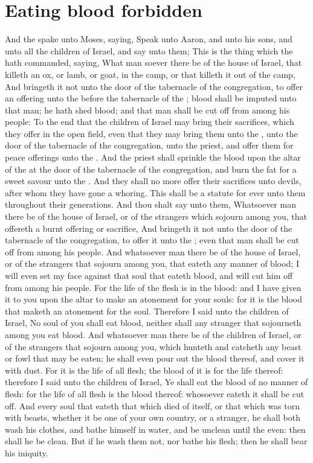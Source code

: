 \section*{Eating blood forbidden}
\begin{biblechapter} %
\verse And the \LORD spake unto Moses, saying,
\verse Speak unto Aaron, and unto his sons, and unto all the children of Israel, and say unto them; This is the thing which the \LORD hath commanded, saying,
\verse What man soever there be of the house of Israel, that killeth an ox, or lamb, or goat, in the camp, or that killeth it out of the camp,
\verse And bringeth it not unto the door of the tabernacle of the congregation, to offer an offering unto the \LORD before the tabernacle of the \LORD; blood shall be imputed unto that man; he hath shed blood; and that man shall be cut off from among his people:
\verse To the end that the children of Israel may bring their sacrifices, which they offer in the open field, even that they may bring them unto the \LORD, unto the door of the tabernacle of the congregation, unto the priest, and offer them for peace offerings unto the \LORD.
\verse And the priest shall sprinkle the blood upon the altar of the \LORD at the door of the tabernacle of the congregation, and burn the fat for a sweet savour unto the \LORD.
\verse And they shall no more offer their sacrifices unto devils, after whom they have gone a whoring. This shall be a statute for ever unto them throughout their generations.
\verse And thou shalt say unto them, Whatsoever man there be of the house of Israel, or of the strangers which sojourn among you, that offereth a burnt offering or sacrifice,
\verse And bringeth it not unto the door of the tabernacle of the congregation, to offer it unto the \LORD; even that man shall be cut off from among his people.
\verse And whatsoever man there be of the house of Israel, or of the strangers that sojourn among you, that eateth any manner of blood; I will even set my face against that soul that eateth blood, and will cut him off from among his people.
\verse For the life of the flesh is in the blood: and I have given it to you upon the altar to make an atonement for your souls: for it is the blood that maketh an atonement for the soul.
\verse Therefore I said unto the children of Israel, No soul of you shall eat blood, neither shall any stranger that sojourneth among you eat blood.
\verse And whatsoever man there be of the children of Israel, or of the strangers that sojourn among you, which hunteth and catcheth any beast or fowl that may be eaten; he shall even pour out the blood thereof, and cover it with dust.
\verse For it is the life of all flesh; the blood of it is for the life thereof: therefore I said unto the children of Israel, Ye shall eat the blood of no manner of flesh: for the life of all flesh is the blood thereof: whosoever eateth it shall be cut off.
\verse And every soul that eateth that which died of itself, or that which was torn with beasts, whether it be one of your own country, or a stranger, he shall both wash his clothes, and bathe himself in water, and be unclean until the even: then shall he be clean.
\verse But if he wash them not, nor bathe his flesh; then he shall bear his iniquity.
\end{biblechapter}

